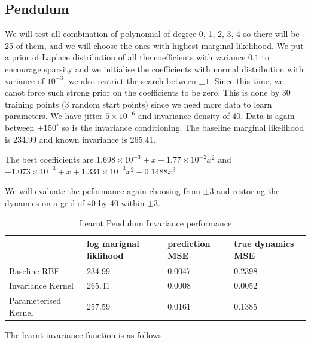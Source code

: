 \documentclass{statsmsc}
\begin{document}
\subsection{Pendulum}
We will test all combination of polynomial of degree 0, 1, 2, 3, 4 so there will be 25 of them, and we will choose the ones with highest marginal likelihood.
We put a prior of Laplace distribution of all the coefficients with variance $0.1$ to encourage sparsity and we initialise the coefficients with normal distribution with variance of $10^{-3}$, we also restrict the search between $\pm 1$. Since this time, we canot force such strong prior on the coefficients to be zero. 
This is done by 30 training points (3 random start points) since we need more data to learn parameters.
We have jitter $5\times 10^{-6}$ and invariance density of 40.
Data is again between $\pm 150^{\circ}$ so is the invariance conditioning.
The baseline marginal likelihood is 234.99 and known invariance is 265.41.

\begin{flushleft}
\begin{table}[H]
  \caption{Log marginal likelihood for polynomial of different degree for pendulum}
  \label{tab:pendulum_paramertised}
\end{table}
\end{flushleft}

The best coefficients are
$1.698\times 10^{-3} + x -1.77\times 10^{-2} x^2$
and 
$-1.073\times 10^{-3} + x + 1.331 \times 10^{-3}x^2 -0.1488x^3$


We will evaluate the peformance again choosing from $\pm 3$ and restoring the dynamics on a grid of 40 by 40 within $\pm 3$.
\begin{table}[H]
  \centering
  \begin{tabular}{l l l l }
    \hline
                    & log marignal liklihood &  prediction MSE  & true dynamics MSE\\
    \hline
Baseline RBF & 234.99 & 0.0047 & 0.2398 \\
Invariance Kernel & 265.41 & 0.0008 & 0.0052 \\
Parameterised Kernel & 257.59 & 0.0161 & 0.1385 \\
    \hline
  \end{tabular}
  \caption{Learnt Pendulum Invariance performance}
  \label{tab:paramertised_pendulum_performance}
\end{table}
The learnt invariance function is as follows
\end{document}
